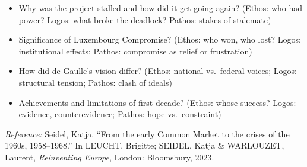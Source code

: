 \documentclass[11pt,a4paper]{article}
\begin{document}
\begin{itemize}
\item Why was the project stalled and how did it get going again? (Ethos: who had power? Logos: what broke the deadlock? Pathos: stakes of stalemate)
\item Significance of Luxembourg Compromise? (Ethos: who won, who lost? Logos: institutional effects; Pathos: compromise as relief or frustration)
\item How did de Gaulle's vision differ? (Ethos: national vs.\ federal voices; Logos: structural tension; Pathos: clash of ideals)
\item Achievements and limitations of first decade? (Ethos: whose success? Logos: evidence, counterevidence; Pathos: hope vs.\ constraint)
\end{itemize}

\vspace{1em}
\noindent\footnotesize\textit{Reference:} Seidel, Katja. ``From the early Common Market to the crises of the 1960s, 1958--1968.'' In LEUCHT, Brigitte; SEIDEL, Katja \& WARLOUZET, Laurent, \textit{Reinventing Europe}, London: Bloomsbury, 2023.
\end{document}
